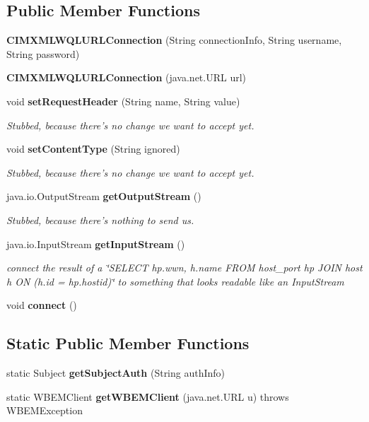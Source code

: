 \subsection*{Public Member Functions}
\begin{DoxyCompactItemize}
\item 
{\bf C\+I\+M\+X\+M\+L\+W\+Q\+L\+U\+R\+L\+Connection} (String connection\+Info, String username, String password)
\item 
{\bf C\+I\+M\+X\+M\+L\+W\+Q\+L\+U\+R\+L\+Connection} (java.\+net.\+U\+R\+L url)
\item 
void {\bf set\+Request\+Header} (String name, String value)
\begin{DoxyCompactList}\small\item\em Stubbed, because there's no change we want to accept yet. \end{DoxyCompactList}\item 
void {\bf set\+Content\+Type} (String ignored)
\begin{DoxyCompactList}\small\item\em Stubbed, because there's no change we want to accept yet. \end{DoxyCompactList}\item 
java.\+io.\+Output\+Stream {\bf get\+Output\+Stream} ()
\begin{DoxyCompactList}\small\item\em Stubbed, because there's nothing to send us. \end{DoxyCompactList}\item 
java.\+io.\+Input\+Stream {\bf get\+Input\+Stream} ()
\begin{DoxyCompactList}\small\item\em connect the result of a \char`\"{}\+S\+E\+L\+E\+C\+T hp.\+wwn, h.\+name F\+R\+O\+M host\+\_\+port hp J\+O\+I\+N host h O\+N (h.\+id = hp.\+hostid)\char`\"{} to something that looks readable like an Input\+Stream \end{DoxyCompactList}\item 
void {\bf connect} ()
\end{DoxyCompactItemize}
\subsection*{Static Public Member Functions}
\begin{DoxyCompactItemize}
\item 
static Subject {\bf get\+Subject\+Auth} (String auth\+Info)
\item 
static W\+B\+E\+M\+Client {\bf get\+W\+B\+E\+M\+Client} (java.\+net.\+U\+R\+L u)  throws W\+B\+E\+M\+Exception     
\end{DoxyCompactItemize}

